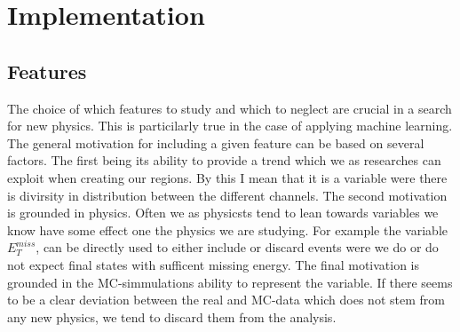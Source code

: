 \chapter{Implementation}\label{chap:Implementation}
\section{Features}
The choice of which features to study and which to neglect are crucial in a search for new physics. This is particilarly true 
in the case of applying machine learning. The general motivation for including a given feature can be based on several factors. 
The first being its ability to provide a trend which we as researches can exploit when creating our regions. By this I mean
that it is a variable were there is divirsity in distribution between the different channels. The second motivation is grounded in 
physics. Often we as physicsts tend to lean towards variables we know have some effect one the physics we are studying. For 
example the variable $E_T^{miss}$, can be directly used to either include or discard events were we do or do not expect final states
with sufficent missing energy. The final motivation is grounded in the MC-simmulations ability to represent the variable.
If there seems to be a clear deviation between the real and MC-data which does not stem from any new physics, we tend to discard
them from the analysis.

